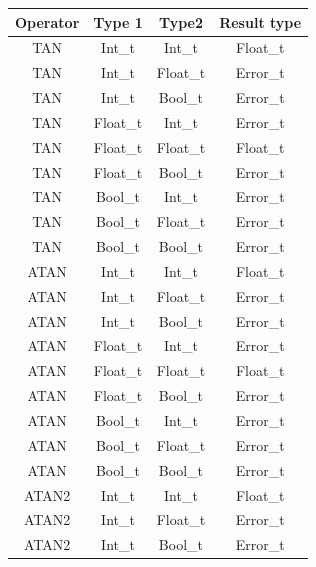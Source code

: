 \begin{figure}[H]
    \centering
    \begin{tabular}{cccc}
        \toprule
        \textbf{Operator} & \textbf{Type 1} & \textbf{Type2} & \textbf{Result type}\\
        \midrule TAN & Int\_t & Int\_t      & Float\_t \\
        \midrule TAN & Int\_t & Float\_t    & Error\_t \\
        \midrule TAN & Int\_t & Bool\_t     & Error\_t \\

        \midrule TAN & Float\_t & Int\_t    & Error\_t \\
        \midrule TAN & Float\_t & Float\_t  & Float\_t \\
        \midrule TAN & Float\_t & Bool\_t   & Error\_t \\

        \midrule TAN & Bool\_t & Int\_t     & Error\_t \\
        \midrule TAN & Bool\_t & Float\_t   & Error\_t \\
        \midrule TAN & Bool\_t & Bool\_t    & Error\_t \\

        \midrule ATAN & Int\_t & Int\_t      & Float\_t \\
        \midrule ATAN & Int\_t & Float\_t    & Error\_t \\
        \midrule ATAN & Int\_t & Bool\_t     & Error\_t \\

        \midrule ATAN & Float\_t & Int\_t    & Error\_t \\
        \midrule ATAN & Float\_t & Float\_t  & Float\_t \\
        \midrule ATAN & Float\_t & Bool\_t   & Error\_t \\

        \midrule ATAN & Bool\_t & Int\_t     & Error\_t \\
        \midrule ATAN & Bool\_t & Float\_t   & Error\_t \\
        \midrule ATAN & Bool\_t & Bool\_t    & Error\_t \\

        \midrule ATAN2 & Int\_t & Int\_t      & Float\_t \\
        \midrule ATAN2 & Int\_t & Float\_t    & Error\_t \\
        \midrule ATAN2 & Int\_t & Bool\_t     & Error\_t \\


\end{tabular}
\end{figure}
